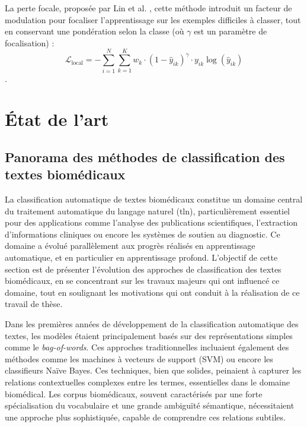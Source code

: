 \documentclass[12pt]{report}
\begin{document}
La perte focale, proposée par Lin et al. \cite{Lin2017Focal}, cette méthode introduit un facteur de modulation pour focaliser l'apprentissage sur les exemples difficiles à classer, tout en conservant une pondération selon la classe (où $\gamma$ est un paramètre de focalisation) :
$$
\mathcal{L}_\text{local} = - \sum_{i=1}^{N} \sum_{k=1}^{K} w_k \cdot (1 - \hat{y}_{ik})^\gamma \cdot y_{ik} \log(\hat{y}_{ik})
$$.

\chapter{État de l’art}

\section{Panorama des méthodes de classification des textes biomédicaux}

La classification automatique de textes biomédicaux constitue un domaine central du traitement automatique du langage naturel (\gls{tln}), particulièrement essentiel pour des applications comme l'analyse des publications scientifiques, l'extraction d'informations cliniques ou encore les systèmes de soutien au diagnostic. Ce domaine a évolué parallèlement aux progrès réalisés en apprentissage automatique, et en particulier en apprentissage profond. L'objectif de cette section est de présenter l'évolution des approches de classification des textes biomédicaux, en se concentrant sur les travaux majeurs qui ont influencé ce domaine, tout en soulignant les motivations qui ont conduit à la réalisation de ce travail de thèse.

Dans les premières années de développement de la classification automatique des textes, les modèles étaient principalement basés sur des représentations simples comme le \textit{bag-of-words}. Ces approches traditionnelles incluaient également des méthodes comme les machines à vecteurs de support (SVM) ou encore les classifieurs Naïve Bayes. Ces techniques, bien que solides, peinaient à capturer les relations contextuelles complexes entre les termes, essentielles dans le domaine biomédical. Les corpus biomédicaux, souvent caractérisés par une forte spécialisation du vocabulaire et une grande ambiguïté sémantique, nécessitaient une approche plus sophistiquée, capable de comprendre ces relations subtiles.
\end{document}
